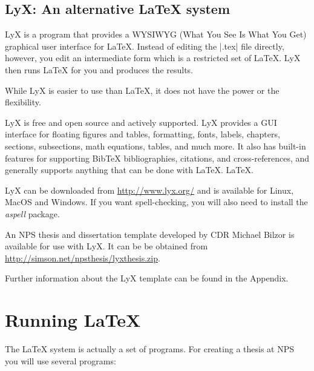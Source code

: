 \subsection{LyX: An alternative \LaTeX{} system}

LyX is a program that provides a WYSIWYG (What You See Is What You Get)
graphical user interface for \LaTeX. Instead of editing the |.tex| file
directly, however, you edit an intermediate form which is a restricted set of
\LaTeX. LyX then runs \LaTeX{} for you and produces the results.

While LyX is easier to use than \LaTeX, it does not have the power or the
flexibility.

LyX is free and open source and actively supported. LyX provides a GUI
interface for floating figures and tables, formatting, fonts, labels, chapters,
sections, subsections, math equations, tables, and much more.  It also has
built-in features for supporting Bib\TeX{} bibliographies, citations, and
cross-references, and generally supports anything that can be done with
\LaTeX{}.  \LaTeX{}.

LyX can be downloaded from  \url{http://www.lyx.org/} and is available for
Linux, MacOS and Windows.  If you want spell-checking, you will also need to
install the \emph{aspell} package. 

An NPS thesis and dissertation template developed by CDR Michael Bilzor is
available for use with LyX. It can be be obtained from
\url{http://simson.net/npsthesis/lyxthesis.zip}.  

Further information about the LyX template can be found in the Appendix.


\section{Running \LaTeX}\label{runninglatex}
The \LaTeX{} system is actually a set of programs. For creating a thesis at NPS you will use several programs:

